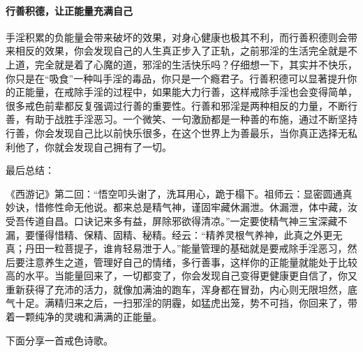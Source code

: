 \paragraph{行善积德，让正能量充满自己}

手淫积累的负能量会带来破坏的效果，对身心健康也极其不利，而行善积德则会带来相反的效果，你会发现自己的人生真正步入了正轨，之前邪淫的生活完全就是不上道，完全就是着了心魔的道，邪淫的生活快乐吗？仔细想一下，其实并不快乐，你只是在“吸食”一种叫手淫的毒品，你只是一个瘾君子。行善积德可以显著提升你的正能量，在戒除手淫的过程中，如果能大力行善，这样戒除手淫也会变得简单，很多戒色前辈都反复强调过行善的重要性。行善和邪淫是两种相反的力量，不断行善，有助于战胜手淫恶习。一个微笑、一句激励都是一种善的布施，通过不断坚持行善，你会发现自己比以前快乐很多，在这个世界上为善最乐，当你真正选择无私利他了，你就会发现自己拥有了一切。

最后总结：

《西游记》第二回：“悟空叩头谢了，洗耳用心，跪于榻下。祖师云：显密圆通真妙诀，惜修性命无他说。都来总是精气神，谨固牢藏休漏泄。休漏泄，体中藏，汝受吾传道自昌。口诀记来多有益，屏除邪欲得清凉。”一定要使精气神三宝深藏不漏，要懂得惜精、保精、固精、秘精。经云：“精养灵根气养神，此真之外更无真；丹田一粒菩提子，谁肯轻易泄于人。”能量管理的基础就是要戒除手淫恶习，然后要注意养生之道，管理好自己的情绪，多行善事，这样你的正能量就能处于比较高的水平。当能量回来了，一切都变了，你会发现自己变得更健康更自信了，你又重新获得了充沛的活力，就像加满油的跑车，浑身都在冒劲，内心则无限坦然，底气十足。满精归来之后，一扫邪淫的阴霾，如猛虎出笼，势不可挡，你回来了，带着一颗纯净的灵魂和满满的正能量。

下面分享一首戒色诗歌。

